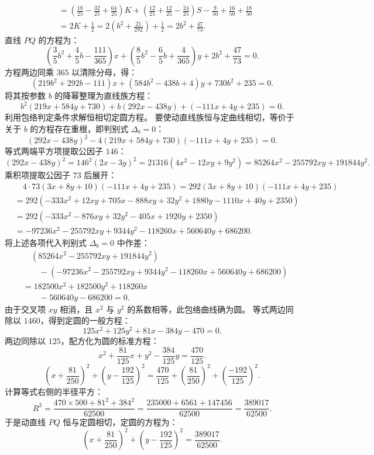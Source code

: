 \begin{solution}
\begin{align*}
&= \left(\frac{18}{25} - \frac{32}{25} + \frac{64}{25}\right)K + \left(\frac{12}{25} + \frac{12}{25} - \frac{24}{25}\right)S - \frac{9}{50} + \frac{16}{50} + \frac{18}{50} \\
&= 2K + \frac{1}{2} = 2\left(b^2 + \frac{21}{292}\right) + \frac{1}{2} = 2b^2 + \frac{47}{73}.
\end{align*}
直线 $PQ$ 的方程为：
\[ \left(\frac{3}{5}b^2 + \frac{4}{5}b - \frac{111}{365}\right)x + \left(\frac{8}{5}b^2 - \frac{6}{5}b + \frac{4}{365}\right)y + 2b^2 + \frac{47}{73} = 0. \]
方程两边同乘 $365$ 以清除分母，得：
\[ (219b^2 + 292b - 111)x + (584b^2 - 438b + 4)y + 730b^2 + 235 = 0. \]
将其按参数 $b$ 的降幂整理为直线族方程：
\[ b^2(219x + 584y + 730) + b(292x - 438y) + (-111x + 4y + 235) = 0. \]
利用包络判定条件求解恒相切定圆方程。
要使动直线族恒与定曲线相切，等价于关于 $b$ 的方程存在重根，即判别式 $\Delta_b = 0$：
\[ (292x - 438y)^2 - 4(219x + 584y + 730)(-111x + 4y + 235) = 0. \]
等式两端平方项提取公因子 $146$：
\[ (292x - 438y)^2 = 146^2(2x - 3y)^2 = 21316(4x^2 - 12xy + 9y^2) = 85264x^2 - 255792xy + 191844y^2. \]
乘积项提取公因子 $73$ 后展开：
\begin{align*}
&\quad 4 \cdot 73(3x + 8y + 10)(-111x + 4y + 235) = 292(3x + 8y + 10)(-111x + 4y + 235) \\
&= 292(-333x^2 + 12xy + 705x - 888xy + 32y^2 + 1880y - 1110x + 40y + 2350) \\
&= 292(-333x^2 - 876xy + 32y^2 - 405x + 1920y + 2350) \\
&= -97236x^2 - 255792xy + 9344y^2 - 118260x + 560640y + 686200.
\end{align*}
将上述各项代入判别式 $\Delta_b = 0$ 中作差：
\begin{align*}
&\quad (85264x^2 - 255792xy + 191844y^2) \\
&\qquad - (-97236x^2 - 255792xy + 9344y^2 - 118260x + 560640y + 686200) \\
&= 182500x^2 + 182500y^2 + 118260x \\
&\qquad - 560640y - 686200 = 0.
\end{align*}
由于交叉项 $xy$ 相消，且 $x^2$ 与 $y^2$ 的系数相等，此包络曲线确为圆。
等式两边同除以 $1460$，得到定圆的一般方程：
\[ 125x^2 + 125y^2 + 81x - 384y - 470 = 0. \]
两边同除以 $125$，配方化为圆的标准方程：
\[ x^2 + \frac{81}{125}x + y^2 - \frac{384}{125}y = \frac{470}{125}. \]
\[ \left(x + \frac{81}{250}\right)^2 + \left(y - \frac{192}{125}\right)^2 = \frac{470}{125} + \left(\frac{81}{250}\right)^2 + \left(\frac{-192}{125}\right)^2. \]
计算等式右侧的半径平方：
\[ R^2 = \frac{470 \times 500 + 81^2 + 384^2}{62500} = \frac{235000 + 6561 + 147456}{62500} = \frac{389017}{62500}. \]
于是动直线 $PQ$ 恒与定圆相切，定圆的方程为：
\[ \left(x + \frac{81}{250}\right)^2 + \left(y - \frac{192}{125}\right)^2 = \frac{389017}{62500}. \]

\end{solution}



